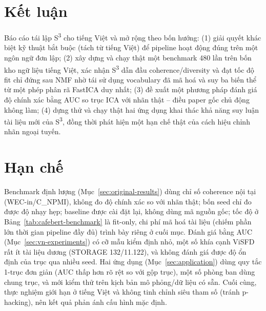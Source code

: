 \documentclass[11pt]{article}
\begin{document}
\section{Kết luận}
\label{sec:conclusion}

Báo cáo tái lập S\textsuperscript{3} \citep{kardos2025s3} cho tiếng Việt
và mở rộng theo bốn hướng: (1) giải quyết khác biệt kỹ thuật bắt buộc
(tách từ tiếng Việt) để pipeline hoạt động đúng trên một ngôn ngữ đơn
lập; (2) xây dựng và chạy thật một benchmark 480 lần trên bốn kho ngữ
liệu tiếng Việt, xác nhận S\textsuperscript{3} dẫn đầu coherence/diversity
và đạt tốc độ fit chỉ đứng sau NMF nhờ tái sử dụng vocabulary đã mã hoá
và suy ba biến thể từ một phép phân rã FastICA duy nhất; (3) đề xuất
một phương pháp đánh giá độ chính
xác bằng AUC so trục ICA với nhãn thật -- điều paper gốc chủ động không
làm; (4) dựng thử và chạy thật hai ứng dụng khai thác khả năng suy luận
tài liệu mới của S\textsuperscript{3}, đồng thời phát hiện một hạn chế
thật của cách hiệu chỉnh nhãn ngoại tuyến.

\section*{Hạn chế}

Benchmark định lượng (Mục~\ref{sec:original-results}) dùng chỉ số
coherence nội tại (WEC-in/C\_NPMI), không đo độ chính xác so với nhãn
thật; bốn seed chỉ đo được độ nhạy hẹp; baseline được cài đặt lại, không
dùng mã nguồn gốc; tốc độ ở Bảng~\ref{tab:cafebert-benchmark} là
fit-only, chi phí mã hoá tài liệu (chiếm phần lớn thời gian pipeline đầy
đủ) trình bày riêng ở cuối mục. Đánh giá bằng AUC (Mục~\ref{sec:vn-experiments}) có cỡ
mẫu kiểm định nhỏ, một số khía cạnh ViSFD rất ít tài liệu dương (STORAGE
132/11.122), và không đánh giá được độ ổn định của trục qua nhiều seed.
Hai ứng dụng (Mục~\ref{sec:application}) dùng quy tắc 1-trục đơn giản
(AUC thấp hơn rõ rệt so với gộp trục), một số phòng ban dùng chung trục,
và mới kiểm thử trên kịch bản mô phỏng/dữ liệu có sẵn. Cuối cùng, thực
nghiệm giới hạn ở tiếng Việt và không tinh chỉnh siêu tham số (tránh
p-hacking), nên kết quả phản ánh cấu hình mặc định.


\end{document}
